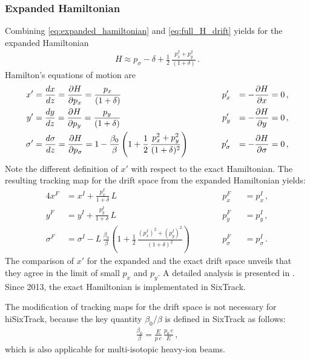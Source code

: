 \subsubsection{Expanded Hamiltonian}
Combining \eqref{eq:expanded_hamiltonian} and \eqref{eq:full_H_drift} yields for the expanded Hamiltonian
\begin{align}
H \approx p_\sigma - \delta + \frac{1}{2} \, \frac{p_x^2+p_y^2}{(1+\delta)} \, . \label{eq:exp_drift}
\end{align}
Hamilton's equations of motion are 
\begin{alignat}{4}
x' &= \frac{d x}{d z} = \frac{\partial H}{\partial p_x} = \frac{p_x}{ (1+\delta) } &p_x' &&= -\frac{\partial H}{\partial x} = 0 \, , \\
y' &= \frac{d y}{d z} = \frac{\partial H}{\partial p_y} = \frac{p_y}{ (1+\delta) } \quad \quad &p_y' &&= -\frac{\partial H}{\partial y} = 0 \, , \\
\sigma' &=  \frac{d \sigma}{d z} = \frac{\partial H}{\partial p_\sigma} =  1 - \frac{\beta_0}{\beta} \left( 1 + \frac{1}{2} \, \frac{p_x^2 + p_y^2}{(1+\delta)^2}  \right)   \quad \quad \quad  &p_\sigma' &&= -\frac{\partial H}{\partial \sigma} = 0 \, , 
\end{alignat}
Note the different definition of $x'$ with respect to the exact Hamiltonian. The resulting tracking map for the drift space from the expanded Hamiltonian yields:
%
\begin{alignat}{4}
x^F &= x^I +   \frac{p_x^I}{1+\delta} \, L  &p_x^F &&= p_x^I \, , \\
y^F &= y^I +   \frac{p_y^I}{1+\delta} \, L  &p_y^F &&= p_y^I \, , \\
\sigma^F &=  \sigma^I - L \, \frac{\beta_0}{\beta} \left( 1 + \frac{1}{2} \, \frac{(p_x^I)^2 + (p_y^I)^2}{(1+\delta)^2}  \right)   \quad \quad \quad  &p_\sigma^F &&=  p_\sigma^I \, .
\end{alignat}
%
The comparison of $x'$ for the expanded and the exact drift space unveils that they agree in the limit of small $p_x$ and $p_y$. A detailed analysis is presented in \cite{Fjellstrom:1642385}. Since 2013, the exact Hamiltonian is implementated in SixTrack.

The modification of tracking maps for the drift space is not necessary for hiSixTrack, because the key quantity $\beta_0/\beta$ is defined in SixTrack as follows:
\begin{align}
\frac{\beta_0}{\beta} = \frac{E}{p \, c} \, \frac{p_0 \, c}{E} \, ,
\end{align}
which is also applicable for multi-isotopic heavy-ion beams.

